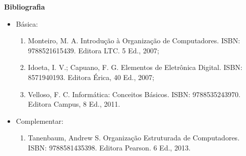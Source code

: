 \begin{snugshade}\begin{center}\textbf{
    Bibliografia
}\end{center}\end{snugshade}

\begin{itemize} 
   \item Básica:
	\begin{enumerate}
		\item Monteiro, M. A. Introdução à Organização de Computadores. ISBN: 9788521615439. Editora LTC. 5 Ed., 2007; 
		\item Idoeta, I. V.; Capuano, F. G. Elementos de Eletrônica Digital. ISBN: 8571940193. Editora Érica, 40 Ed., 2007;
		\item Velloso, F. C. Informática: Conceitos Básicos. ISBN: 9788535243970. Editora Campus, 8 Ed., 2011. 
	\end{enumerate}
  \item Complementar:
	\begin{enumerate} 
		\item Tanenbaum, Andrew S. Organização Estruturada de Computadores. ISBN: 9788581435398. Editora Pearson. 6 Ed., 2013.
	\end{enumerate}
\end{itemize}
